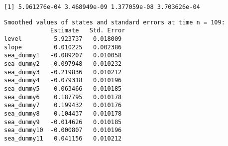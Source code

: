 \documentclass[]{book}
\newenvironment{Shaded}{\begin{snugshade}}{\end{snugshade}}
\newcommand{\CommentTok}[1]{\textcolor[rgb]{0.56,0.35,0.01}{\textit{#1}}}
\newcommand{\DataTypeTok}[1]{\textcolor[rgb]{0.13,0.29,0.53}{#1}}
\newcommand{\DecValTok}[1]{\textcolor[rgb]{0.00,0.00,0.81}{#1}}
\newcommand{\KeywordTok}[1]{\textcolor[rgb]{0.13,0.29,0.53}{\textbf{#1}}}
\newcommand{\NormalTok}[1]{#1}
\newcommand{\OperatorTok}[1]{\textcolor[rgb]{0.81,0.36,0.00}{\textbf{#1}}}
\newcommand{\OtherTok}[1]{\textcolor[rgb]{0.56,0.35,0.01}{#1}}
\newcommand{\StringTok}[1]{\textcolor[rgb]{0.31,0.60,0.02}{#1}}
\begin{document}
\begin{Shaded}
\end{Shaded}

\begin{verbatim}
[1] 5.961276e-04 3.468949e-09 1.377059e-08 3.703626e-04
\end{verbatim}

\begin{Shaded}
\end{Shaded}

\begin{verbatim}
Smoothed values of states and standard errors at time n = 109:
             Estimate   Std. Error
level         5.923737   0.018009 
slope         0.010225   0.002386 
sea_dummy1   -0.089207   0.010058 
sea_dummy2   -0.097948   0.010232 
sea_dummy3   -0.219836   0.010212 
sea_dummy4   -0.079318   0.010196 
sea_dummy5    0.063466   0.010185 
sea_dummy6    0.187795   0.010178 
sea_dummy7    0.199432   0.010176 
sea_dummy8    0.104437   0.010178 
sea_dummy9   -0.014626   0.010185 
sea_dummy10  -0.000807   0.010196 
sea_dummy11   0.041156   0.010212 
\end{verbatim}
\end{document}
